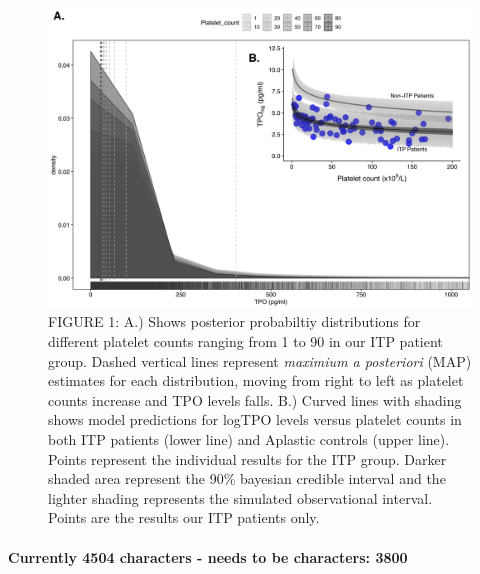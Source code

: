\documentclass[11pt]{article}
\begin{document}

\begin{figure}
\includegraphics[width=\textwidth]{ABSTRACT_v3_graph1.png}
\caption {FIGURE 1: A.) Shows posterior probabiltiy distributions for different platelet counts ranging from 1 to 90 in our ITP patient group. Dashed vertical lines represent \textit{maximium a posteriori} (MAP) estimates for each distribution, moving from right to left as platelet counts increase and TPO levels falls. B.) Curved lines with shading shows model predictions for logTPO levels versus platelet counts in both ITP patients (lower line) and Aplastic controls (upper line). Points represent the individual results for the ITP group. Darker shaded area represent the 90\% bayesian credible interval and the lighter shading represents the simulated observational interval. Points are the results our ITP patients only.}
\end{figure}





\paragraph{}
\textbf{Currently 4504 characters - needs to be characters: 3800}
\end{document}
